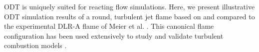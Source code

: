 \documentclass[preprint,12pt, a4paper]{elsarticle}
\begin{document}
%
%
%
%
%
%


ODT is uniquely suited for reacting flow simulations. Here, we present illustrative ODT simulation results of a round, turbulent jet flame based on and compared to the experimental DLR-A flame of Meier et al. \cite{Meier_2000}. This canonical flame configuration has been used extensively to study and validate turbulent combustion models \cite{Pitsch_2000,Lindstedt_2005,Wang_2011,Fairweather_2004,Lee_2008,Lee_2009}. 
\end{document}

